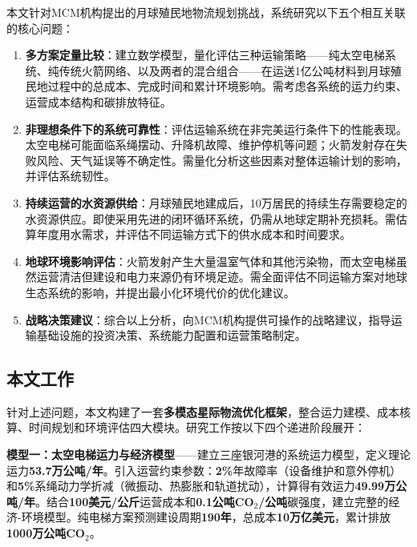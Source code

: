 本文针对MCM机构提出的月球殖民地物流规划挑战，系统研究以下五个相互关联的核心问题：

\begin{enumerate}
    \item \textbf{多方案定量比较}：建立数学模型，量化评估三种运输策略——纯太空电梯系统、纯传统火箭网络、以及两者的混合组合——在运送1亿公吨材料到月球殖民地过程中的总成本、完成时间和累计环境影响。需考虑各系统的运力约束、运营成本结构和碳排放特征。
    
    \item \textbf{非理想条件下的系统可靠性}：评估运输系统在非完美运行条件下的性能表现。太空电梯可能面临系绳摆动、升降机故障、维护停机等问题；火箭发射存在失败风险、天气延误等不确定性。需量化分析这些因素对整体运输计划的影响，并评估系统韧性。
    
    \item \textbf{持续运营的水资源供给}：月球殖民地建成后，10万居民的持续生存需要稳定的水资源供应。即使采用先进的闭环循环系统，仍需从地球定期补充损耗。需估算年度用水需求，并评估不同运输方式下的供水成本和时间要求。
    
    \item \textbf{地球环境影响评估}：火箭发射产生大量温室气体和其他污染物，而太空电梯虽然运营清洁但建设和电力来源仍有环境足迹。需全面评估不同运输方案对地球生态系统的影响，并提出最小化环境代价的优化建议。
    
    \item \textbf{战略决策建议}：综合以上分析，向MCM机构提供可操作的战略建议，指导运输基础设施的投资决策、系统能力配置和运营策略制定。
\end{enumerate}

\subsection{本文工作}

针对上述问题，本文构建了一套\textbf{多模态星际物流优化框架}，整合运力建模、成本核算、时间规划和环境评估四大模块。研究工作按以下四个递进阶段展开：

\textbf{模型一：太空电梯运力与经济模型}——建立三座银河港的系统运力模型，定义理论运力\textbf{53.7万公吨/年}。引入运营约束参数：\textbf{2\%}年故障率（设备维护和意外停机）和\textbf{5\%}系绳动力学折减（微振动、热膨胀和轨道扰动），计算得有效运力\textbf{49.99万公吨/年}。结合\textbf{100美元/公斤}运营成本和\textbf{0.1公吨CO$_2$/公吨}碳强度，建立完整的经济-环境模型。纯电梯方案预测建设周期\textbf{190年}，总成本\textbf{10万亿美元}，累计排放\textbf{1000万公吨CO$_2$}。

